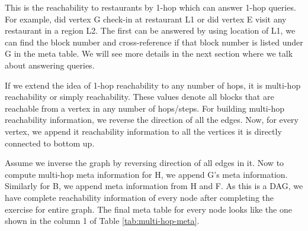 
This is the reachability to restaurants by 1-hop which can answer 1-hop queries. For example, did vertex G check-in at restaurant L1 or did vertex E visit any restaurant in a region L2. The first can be answered by using location of L1, we can find the block number and cross-reference if that block number is listed under G in the meta table. We will see more details in the next section where we talk about answering queries.

If we extend the idea of 1-hop reachability to any number of hops, it is multi-hop reachability or simply reachability. These values denote all blocks that are reachable from a vertex in any number of hops/steps. For building multi-hop reachability information, we reverse the direction of all the edges. Now, for every vertex, we append it reachability information to all the vertices it is directly connected to bottom up.

Assume we inverse the graph by reversing direction of all edges in it. Now to compute multi-hop meta information for H, we append G's meta information. Similarly for B, we append meta information from H and F. As this is a DAG, we have complete reachability information of every node after completing the exercise for entire graph. The final meta table for every node looks like the one shown in the column 1 of Table \ref{tab:multi-hop-meta}.

